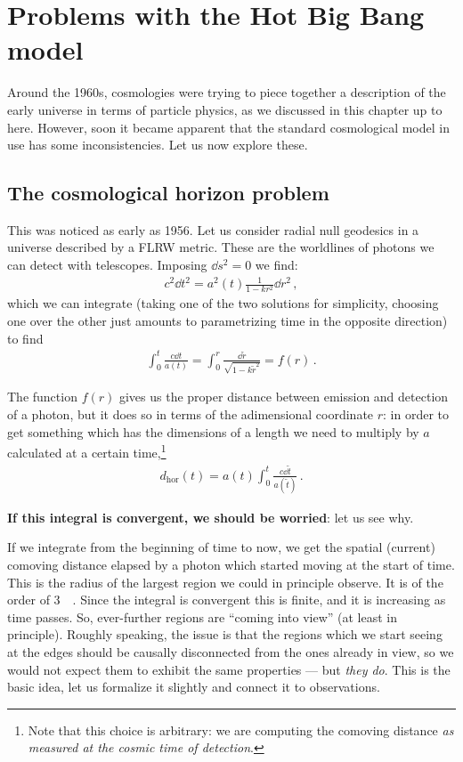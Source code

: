 \documentclass[main.tex]{subfiles}
\begin{document}

\section{Problems with the Hot Big Bang model}

Around the 1960s, cosmologies were trying to piece together a description of the early universe in terms of particle physics, as we discussed in this chapter up to here.
However, soon it became apparent that the standard cosmological model in use has some inconsistencies.
Let us now explore these. 

\subsection{The cosmological horizon problem}

This was noticed as early as 1956. 
Let us consider radial null geodesics in a universe described by a FLRW metric. These are the worldlines of photons we can detect with telescopes.
Imposing \(\dd{s}^2 = 0 \) we find: 
%
\begin{align}
  c^2 \dd{t^2} = a^2(t) \frac{1}{1-kr^2} \dd{r^2} 
\,,
\end{align}
%
which we can integrate (taking one of the two solutions for simplicity, choosing one over the other just amounts to parametrizing time in the opposite direction) to find
%
\begin{align}
  \int_0^{t} \frac{c \dd{t}}{a(t)} = \int_0^r \frac{ \dd{\widetilde{r}} }{\sqrt{1-k \widetilde{r}^2}} = f(r)
\,.
\end{align}

The function \(f(r)\) gives us the proper distance between emission and detection of a photon, but it does so in terms of the adimensional coordinate \(r\): in order to get something which has the dimensions of a length we need to multiply by \(a\) calculated at a certain time,\footnote{Note that this choice is arbitrary: we are computing the comoving distance \emph{as measured at the cosmic time of detection}.}
%
\begin{align}
  d _{\text{hor}} (t) = a(t) \int_0^{t} \frac{c \dd{\widetilde{t}}}{a(\widetilde{t})}
\,.
\end{align}

\textbf{If this integral is convergent, we should be worried}: let us see why.

If we integrate from the beginning of time to now, we get the spatial (current) comoving distance elapsed by a photon which started moving at the start of time.
This is the radius of the largest region we could in principle observe. It is of the order of \SI{3}{\giga\parsec}.
Since the integral is convergent this is finite, and it is increasing as time passes. So, ever-further regions are ``coming into view'' (at least in principle). 
Roughly speaking, the issue is that the regions which we start seeing at the edges should be causally disconnected from the ones already in view, so we would not expect them to exhibit the same properties --- but \emph{they do}.
This is the basic idea, let us formalize it slightly and connect it to observations.
\end{document}
